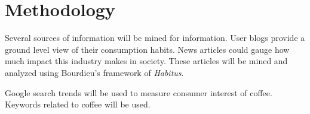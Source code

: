 \section{Methodology}\label{sec:methodology}

Several sources of information will be mined for information. User blogs provide
a ground level view of their consumption habits. News articles could gauge how
much impact this industry makes in society.
These articles will be mined and analyzed using Bourdieu's framework of
\emph{Habitus}.

Google search trends will be used to measure consumer interest of coffee.
Keywords related to coffee will be used.

